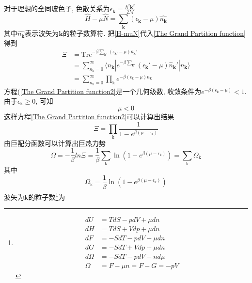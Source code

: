 \documentclass{book}
\begin{document}
对于理想的全同玻色子, 色散关系为$\epsilon_\mathbf{k}=\frac{\hbar^2\mathbf{k}^2}{2M}$
\begin{equation}\label{H-muN}
  \hat{H}-\mu\hat{N}=\sum_{\mathbf{k}}(\epsilon_{\mathbf{k}}-\mu)\hat{n_{\mathbf{k}}}
\end{equation}
其中$\hat{n_{\mathbf{k}}}$表示波矢为$\mathbf{k}$的粒子数算符. 把\eqref{H-muN}代入\eqref{The Grand Partition function}得到
\begin{equation}\label{The Grand Partition function2}
  \begin{split}
     \Xi & =\mathrm{Tr}e^{-\beta\sum_{\mathbf{k}'}(\epsilon_{\mathbf{k}'}-\mu)\hat{n}_\mathbf{k}'} \\
       & =\sum_{n_\mathrm{k}=0}^{\infty}\langle n_\mathbf{k}|e^{-\beta\sum_{\mathbf{k}'}}(\epsilon_\mathbf{k}'-\mu)\hat{n}_\mathbf{k}'|n_\mathbf{k}\rangle \\
       & =\sum_{n_\mathrm{k}=0}^{\infty}\prod_{\mathrm{k}}e^{-\beta(\epsilon_\mathrm{k}-\mu)n_\mathbf{k}}
  \end{split}
\end{equation}
方程(\eqref{The Grand Partition function2}是一个几何级数, 收敛条件为$e^{-\beta(\epsilon_\mathrm{k}-\mu)}<1$. 由于$\epsilon_\mathrm{k}\geq0$, 可知
\begin{equation}
  \mu<0
\end{equation}
这样方程\eqref{The Grand Partition function2}可以计算出结果
\begin{equation*}
  \Xi=\prod_{\mathrm{k}}\frac{1}{1-e^{\beta(\mu-\epsilon_\mathrm{k})}}
\end{equation*}
由巨配分函数可以计算出巨热力势
\begin{equation}\label{1.2 thermodynamic potential}
  \Omega=-\frac{1}{\beta}ln\Xi=\frac{1}{\beta}\sum_{\mathrm{k}}\ln(1-e^{\beta(\mu-\epsilon_\mathrm{k})})=\sum_{\mathrm{k}}\Omega_{\mathrm{k}}
\end{equation}
其中
\begin{equation}\label{1.2 thermodynamic potential single}
  \Omega_\mathrm{k}=\frac{1}{\beta}\ln(1-e^{\beta(\mu-\epsilon_\mathrm{k})})
\end{equation}
波矢为$\mathbf{k}$的粒子数\footnote{\begin{equation*}
                               \begin{split}
                                  dU & =TdS-pdV+\mu dn \\
                                  dH & =TdS+Vdp+\mu dn \\
                                  dF & =-SdT-pdV+\mu dn \\
                                  dG & =-SdT+Vdp+\mu dn \\
                                  d\Omega & =-SdT-pdV-n d\mu\\
                                  \Omega & =F-\mu n=F-G=-pV
                               \end{split}
                             \end{equation*}}为
\end{document}
